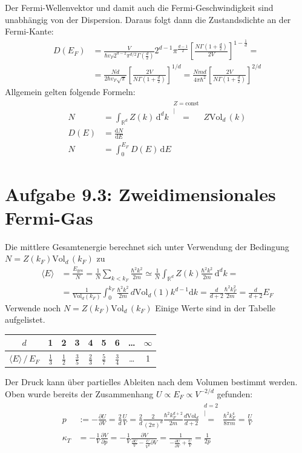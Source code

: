 \documentclass[a4paper,12pt]{article}
\newcommand{\bra}{}
\newcommand{\kom}{}
\newcommand{\intx}{}
\newcommand{\intr}{}
\newcommand{\kla}{}
\newcommand{\klam}{}
\newcommand{\tecxt}{}
\begin{document}
Der Fermi-Wellenvektor und damit auch die Fermi-Geschwindigkeit sind unabhängig von der Dispersion. Daraus folgt dann die Zustandsdichte an der Fermi-Kante:
\begin{align*}
D(E_F)&=\frac{V}{\hbar v_F2^{d-2}\pi^{d/2}\Gamma\kla\left( {\frac{d}{2}} \right)}2^{d-1}\pi^{\frac{d-1}{2}}\klam\left[ {\frac{N\Gamma\kla\left( {1+\frac{d}{2}} \right)}{2V}} \right]^{1-\frac{1}{d}}=\\
&=\frac{Nd}{2\hbar v_F\sqrt{\pi}}\klam\left[ {\frac{2V}{N\Gamma\kla\left( {1+\frac{d}{2}} \right)}} \right]^{1/d}=\frac{Nmd}{4\pi\hbar^2}\klam\left[ {\frac{2V}{N\Gamma\kla\left( {1+\frac{d}{2}} \right)}} \right]^{2/d}
\end{align*}
Allgemein gelten folgende Formeln:
\begin{align*}
N&=\intr\int_{\mathbb{R}^{d}}{Z(k)}\,\mathrm{d}^{d}k\kom\overset{\substack{{Z=\tecxt\text{const}} \\ |}}{=}Z\tecxt\text{Vol}_d\,(k)\\
D(E)&=\frac{\tecxt\text{d}N}{\tecxt\text{d}E}\\
N&=\intx\int_{0}^{E_F}D(E)\,\mathrm{d}E
\end{align*}
\section*{Aufgabe 9.3: Zweidimensionales Fermi-Gas}
Die mittlere Gesamtenergie berechnet sich unter Verwendung der Bedingung $N=Z(k_F)\tecxt\text{Vol}_d\,(k_F)$ zu
\begin{align*}
\bra\langle {E}\rangle&=\frac{E_\tecxt\text{ges}}{N}=\frac{1}{N}\sum_{k<k_F}\frac{\hbar^2k^2}{2m}\simeq\frac{1}{N}\intr\int_{\mathbb{R}^{d}}{Z(k)\frac{\hbar^2k^2}{2m}}\,\mathrm{d}^{d}k=\\
&=\frac{1}{\tecxt\text{Vol}_d(k_F)}\intx\int_{0}^{k_F}\frac{\hbar^2k^2}{2m}\,d\tecxt\text{Vol}_d(1)k^{d-1}\mathrm{d}k=\frac{d}{d+2}\frac{\hbar^2k_F^2}{2m}=\frac{d}{d+2}E_F
\end{align*}
Verwende noch $N=Z(k_F)\tecxt\text{Vol}_d\,(k_F)$
Einige Werte sind in der Tabelle aufgelistet.
\begin{table}[h!]
\centering
\begin{tabular}{c|c|c|c|c|c|c|c|c}
$d$&1&2&3&4&5&6&\dots &$\infty$\\ \hline
$\bra\langle {E}\rangle\,/\,E_F$&$\frac{1}{3}$&$\frac{1}{2}$&$\frac{3}{5}$&$\frac{2}{3}$&$\frac{5}{7}$&$\frac{3}{4}$&\dots &1\\
\end{tabular}
\end{table}
Der Druck kann über partielles Ableiten nach dem Volumen bestimmt werden. Oben wurde bereits der Zusammenhang $U\propto E_F\propto V^{-2/d}$ gefunden:
\begin{align*}
p&:=-\frac{\partial U}{\partial V}=\frac{2}{d}\frac{U}{V}=\frac{2}{d}\frac{2}{(2\pi)^d}\frac{\hbar^2k_F^{d+2}}{2m}\frac{d\tecxt\text{Vol}_d}{d+2}\kom\overset{\substack{{d=2} \\ |}}{=}\frac{\hbar^2k_F^4}{8\pi m}=\frac{U}{V}\\
\kappa_T&=-\frac{1}{V}\frac{\partial V}{\partial p}=-\frac{1}{V}\frac{\partial V}{\frac{\partial U}{V}-\frac{U}{V^2}\partial V}=\frac{1}{-\frac{\partial U}{\partial V}+\frac{U}{V}}=\frac{1}{2p}
\end{align*} 
\end{document}
